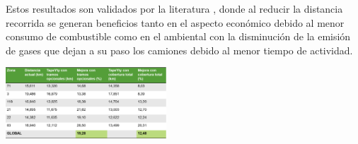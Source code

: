 \documentclass[a0,portrait, final]{a0poster}
\begin{document}
\begin{multicols}{2}
Estos resultados son validados por la literatura \cite{Braier2017AnArgentina, Vu2018ParameterModel}, donde al reducir la distancia recorrida se generan beneficios tanto en el aspecto económico debido al menor consumo de combustible como en el ambiental con la disminución de la emisión de gases que dejan a su paso los camiones debido al menor tiempo de actividad.

\begin{center}
\includegraphics[width=0.45\textwidth]{./figures/resultadoComparacionDistancias.png}
    \label{fig:distancias}
\end{center}



\end{multicols}
\end{document}
